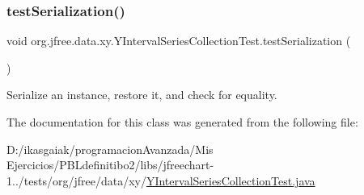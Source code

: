 \subsubsection{\texorpdfstring{test\+Serialization()}{testSerialization()}}
{\footnotesize\ttfamily void org.\+jfree.\+data.\+xy.\+Y\+Interval\+Series\+Collection\+Test.\+test\+Serialization (\begin{DoxyParamCaption}{ }\end{DoxyParamCaption})}

Serialize an instance, restore it, and check for equality. 

The documentation for this class was generated from the following file\+:\begin{DoxyCompactItemize}
\item 
D\+:/ikasgaiak/programacion\+Avanzada/\+Mis Ejercicios/\+P\+B\+Ldefinitibo2/libs/jfreechart-\/1../tests/org/jfree/data/xy/\mbox{\hyperlink{_y_interval_series_collection_test_8java}{Y\+Interval\+Series\+Collection\+Test.\+java}}\end{DoxyCompactItemize}
